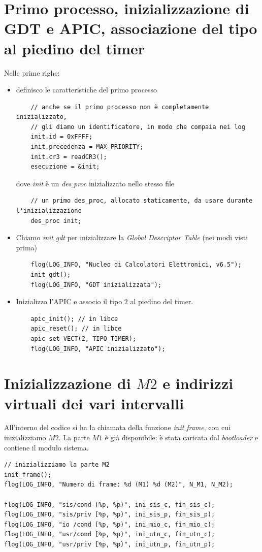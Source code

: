 \documentclass[11pt]{report}
\theoremstyle{definition}
\begin{document}
\section{Primo processo, inizializzazione di GDT e APIC, associazione del tipo al piedino del timer}
Nelle prime righe:
\begin{itemize}
	\item definisco le caratteristiche del primo processo
	\begin{verbatim}
	// anche se il primo processo non è completamente inizializzato,
	// gli diamo un identificatore, in modo che compaia nei log
	init.id = 0xFFFF;
	init.precedenza = MAX_PRIORITY;
	init.cr3 = readCR3();
	esecuzione = &init;
	\end{verbatim}
	dove \emph{init} è un \emph{des$\_$proc} inizializzato nello stesso file
	\begin{verbatim}
	// un primo des_proc, allocato staticamente, da usare durante l'inizializzazione
	des_proc init;
	\end{verbatim}
	\item Chiamo \emph{init$\_$gdt} per inizializzare la \emph{Global Descriptor Table} (nei modi visti prima)
	\begin{verbatim}
	flog(LOG_INFO, "Nucleo di Calcolatori Elettronici, v6.5");
	init_gdt();
	flog(LOG_INFO, "GDT inizializzata");
	\end{verbatim}
	\item Inizializzo l'APIC e associo il tipo $2$ al piedino del timer.
	\begin{verbatim}
	apic_init(); // in libce
	apic_reset(); // in libce
	apic_set_VECT(2, TIPO_TIMER);
	flog(LOG_INFO, "APIC inizializzato");
	\end{verbatim}
\end{itemize}
\small

\normalsize 
\section{Inizializzazione di $M2$ e indirizzi virtuali dei vari intervalli}	
All'interno del codice si ha la chiamata della funzione \emph{init$\_$frame}, con cui inizializziamo $M2$. La parte $M1$ è già disponibile: è stata caricata dal \emph{bootloader} e contiene il modulo sistema.
\small 
\begin{verbatim}
// inizializziamo la parte M2
init_frame();
flog(LOG_INFO, "Numero di frame: %d (M1) %d (M2)", N_M1, N_M2);

flog(LOG_INFO, "sis/cond [%p, %p)", ini_sis_c, fin_sis_c);
flog(LOG_INFO, "sis/priv [%p, %p)", ini_sis_p, fin_sis_p);
flog(LOG_INFO, "io /cond [%p, %p)", ini_mio_c, fin_mio_c);
flog(LOG_INFO, "usr/cond [%p, %p)", ini_utn_c, fin_utn_c);
flog(LOG_INFO, "usr/priv [%p, %p)", ini_utn_p, fin_utn_p);
\end{verbatim}
\normalsize 
\end{document}
